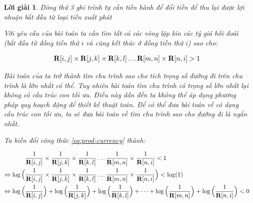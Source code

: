 \documentclass[14pt, a4paper]{article}
\theoremstyle{sltheorem}
\theoremstyle{soltheorem}
\newtheorem*{loigiai}{Lời giải}
\begin{document}
\begin{loigiai}
        Dòng thứ 3 ghi trình tự cần tiến hành để đổi tiền để thu lại được lợi nhuận bắt đầu từ loại tiền xuất phát

        Với yêu cầu của bài toán ta cần tìm tất cả các vòng lặp kín các tỷ giá hối đoái (bắt đầu từ đồng tiền thứ $i$ và cũng kết thúc ở đồng tiền thứ $i$) sao cho:


        \begin{equation}
            \bold{R} \lbrack i, j \rbrack \times \bold{R} \lbrack j, k \rbrack \times \bold{R} \lbrack k, l \rbrack \dots \bold{R} \lbrack m, n \rbrack \times \bold{R} \lbrack n, i \rbrack > 1
            \label{eq:prod-currency}
        \end{equation}

        Bài toán của ta trở thành tìm chu trình sao cho tích trọng số đường đi trên chu trình là lớn nhất có thể.
        Tuy nhiên bài toán tìm chu trình có trọng số lớn nhất lại không có cấu trúc con tối ưu.
        Điều này dẫn đến ta không thể áp dụng phương pháp quy hoạch động để thiết kế thuật toán.
        Để có thể đưa bài toán về có dạng cấu trúc con tối ưu, ta sẽ đưa bài toán về tìm chu trình sao cho đường đi là ngắn nhất.

        Ta biến đổi công thức \ref{eq:prod-currency} thành:

        \begin{equation*}
            \begin{aligned}
                &\dfrac{1}{\bold{R} \lbrack i, j \rbrack} \times \dfrac{1}{\bold{R} \lbrack j, k \rbrack} \times \dfrac{1}{\bold{R} \lbrack k, l \rbrack} \dots \dfrac{1}{\bold{R} \lbrack m, n \rbrack} \times \dfrac{1}{\bold{R} \lbrack n, i \rbrack} < 1 \\
                \Leftrightarrow  \log\Big( & \dfrac{1}{\bold{R} \lbrack i, j \rbrack} \times \dfrac{1}{\bold{R} \lbrack j, k \rbrack} \times \dfrac{1}{\bold{R} \lbrack k, l \rbrack} \dots \dfrac{1}{\bold{R} \lbrack m, n \rbrack} \times \dfrac{1}{\bold{R} \lbrack n, i \rbrack} \Big) < \log(1) \\
                \Leftrightarrow \log\Big( & \dfrac{1}{\bold{R} \lbrack i, j \rbrack} \Big) + \log\Big( \dfrac{1}{\bold{R} \lbrack j, k \rbrack} \Big) + \log\Big( \dfrac{1}{\bold{R} \lbrack k, l \rbrack} \Big) + \dots + \log\Big( \dfrac{1}{\bold{R} \lbrack m, n \rbrack} \Big) + \log\Big( \dfrac{1}{\bold{R} \lbrack n, i \rbrack} \Big) < 0
            \end{aligned}
        \end{equation*}


\end{loigiai}
\end{document}
